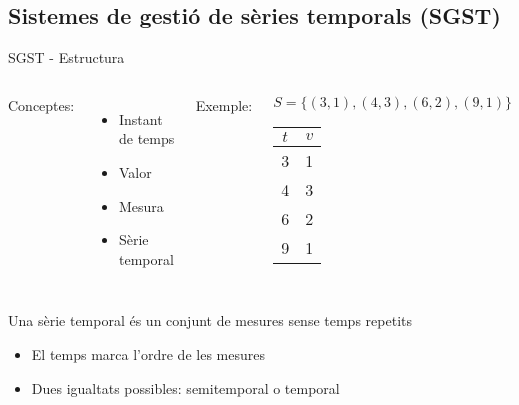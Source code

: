 \subsection[SGST]{Sistemes de gestió de sèries temporals (SGST)}




\begin{frame}{SGST - Estructura}


\begin{columns}

  \column{5cm}

  Conceptes:
  \begin{itemize}

  \item Instant de temps
  \item Valor
  \item Mesura
  \item Sèrie temporal

  \end{itemize}



  \column{5.1cm}
  Exemple:
  \begin{center}
    $S=\{(3,1), (4,3), (6,2), (9,1)\}$\\[1em]

    \begin{tabular}[h]{|c|c|}\hline
      $t$ & $v$ \\\hline
      3 & 1 \\
      4 & 3 \\
      6 & 2 \\
      9 & 1 \\\hline
    \end{tabular}

  \end{center}

\end{columns}

\begin{block}{Una sèrie temporal és un conjunt de mesures sense temps repetits}
  \begin{itemize}
  \item El temps marca l'ordre de les mesures
  \item Dues igualtats possibles: semitemporal o temporal
  \end{itemize} 
\end{block}

\end{frame}




